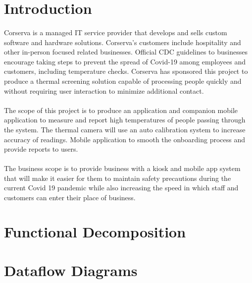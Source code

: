 \documentclass[12pt, letterpaper]{article}
\begin{document}
    
    \newpage
    \tableofcontents
    \newpage
    \section{Introduction}
    \paragraph{}
    Corserva is a managed IT service provider that develops and sells custom software and 
    hardware solutions. Corserva's customers include hospitality and other in-person focused 
    related businesses. Official CDC guidelines to businesses encourage taking steps to prevent 
    the spread of Covid-19 among employees and customers, including temperature checks. Corserva 
    has sponsored this project to produce a thermal screening solution capable of processing 
    people quickly and without requiring user interaction to minimize additional contact.
    \paragraph{}
    The scope of this project is to produce an application and companion mobile application to 
    measure and report high temperatures of people passing through the system. The thermal 
    camera will use an auto calibration system to increase accuracy of readings. Mobile 
    application to smooth the onboarding process and provide reports to users.
    \paragraph{}
    The business scope is to provide business with a kiosk and mobile app
    system that will make it easier for them to maintain safety precautions during
    the current Covid 19 pandemic while also increasing the speed in which staff and customers 
    can enter their place of business.
    \section{Functional Decomposition}
    \begin{figure}
        
    \end{figure}
    \section{Dataflow Diagrams}
    
\end{document}
